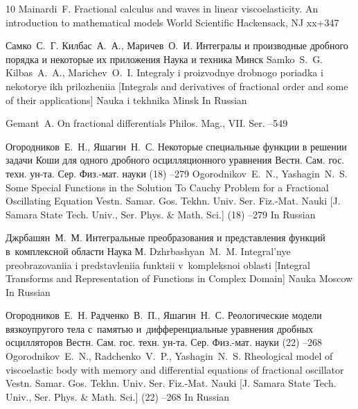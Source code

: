 \begin{thebibliography}{10}
\by Mainardi~F.
\book Fractional calculus and waves in linear viscoelasticity. An introduction to mathematical models
\publ World Scientific
\publaddr Hackensack, NJ
\totalpages xx+347

\by Самко~С.~Г. Килбас~А.~А., Маричев~О.~И.
\book Интегралы и производные дробного порядка и некоторые их приложения
\publ Наука и техника
\publaddr Минск
\misctransl
\by Samko~S.~G. Kilbas~A.~A., Marichev~O.~I.
\book Integraly i proizvodnye drobnogo poriadka i nekotorye ikh prilozheniia \rm [Integrals and derivatives of fractional order and some of their applications]
\publ Nauka i tekhnika
\publaddr Minsk
\lang In Russian


\by Gemant~A.
\paper On fractional differentials
\jour Philos. Mag., VII. Ser.
--549

\by Огородников~Е.~Н., Яшагин~Н.~С.
\paper Некоторые специальные функции в решении задачи Коши для одного дробного осцилляционного уравнения
\jour Вестн. Сам. гос. техн. ун-та. Сер. Физ.-мат. науки
(18)
--279
\misctransl
\by Ogorodnikov~E.~N., Yashagin~N.~S.
\paper Some Special Functions in the Solution To Cauchy Problem for a Fractional Oscillating Equation
\jour Vestn. Samar. Gos. Tekhn. Univ. Ser. Fiz.-Mat. Nauki \rm [J. Samara State Tech. Univ., Ser. Phys. \& Math. Sci.]
(18)
--279
\lang In Russian


\by Джрбашян~М.~М.
\book Интегральные преобразования и представления функций в~комплексной области
\publ Наука
\publaddr М.
\misctransl
\by Dzhrbashyan~M.~M.
\book Integral'nye preobrazovaniia i predstavleniia funktsii v~kompleksnoi oblasti \rm [Integral Transforms and Representation of Functions in Complex Domain]
\publ Nauka
\publaddr Moscow
\lang In Russian


\by Огородников~Е.~Н. Радченко~В.~П., Яшагин~Н.~С.
\paper Реологические модели вязкоупругого тела с~памятью и~дифференциальные уравнения дробных осцилляторов
\jour Вестн. Сам. гос. техн. ун-та. Сер. Физ.-мат. науки
(22)
--268
\misctransl
\by Ogorodnikov~E.~N., Radchenko~V.~P., Yashagin~N.~S.
\paper Rheological model of viscoelastic body with memory and differential equations of fractional oscillator
\jour Vestn. Samar. Gos. Tekhn. Univ. Ser. Fiz.-Mat. Nauki \rm [J. Samara State Tech. Univ., Ser. Phys. \& Math. Sci.]
(22)
--268
\lang In Russian



\end{thebibliography}
